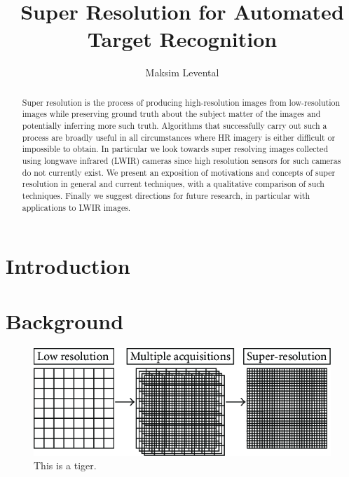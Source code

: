 \documentclass[journal]{IEEEtran}
\begin{document}
    \title{Super Resolution for Automated Target Recognition}
    \author{Maksim Levental}
    \maketitle

    \begin{abstract}
        Super resolution is the process of producing high-resolution images from low-resolution images while preserving ground truth about the subject matter of the images and potentially inferring more such truth.
        Algorithms that successfully carry out such a process are broadly useful in all circumstances where HR imagery is either difficult or impossible to obtain.
        In particular we look towards super resolving images collected using longwave infrared (LWIR) cameras since high resolution sensors for such cameras do not currently exist.
        We present an exposition of motivations and concepts of super resolution in general and current techniques, with a qualitative comparison of such techniques.
        Finally we suggest directions for future research, in particular with applications to LWIR images.
    \end{abstract}

    \section{Introduction}\label{sec:introduction}
    

    \section{Background}\label{sec:background}

    \begin{figure}
        \includegraphics[width=\textwidth,height=\textheight,keepaspectratio]{images/misr.png}
        \caption{This is a tiger.}
    \end{figure}
\end{document}

